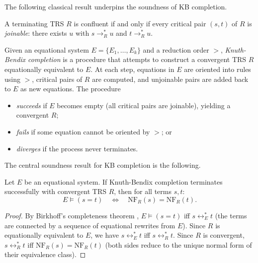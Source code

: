 The following classical result underpins the soundness of KB completion.

\begin{theorem}\label{thm:cpl}
A terminating TRS $R$ is confluent if and only if every critical pair $(s, t)$ of
$R$ is \emph{joinable}: there exists $u$ with $s \to_R^* u$ and $t \to_R^* u$.
\end{theorem}

\begin{definition}
\label{def:kb}
Given an equational system $E = \{E_1, \ldots, E_k\}$ and a reduction order $>$,
\emph{Knuth-Bendix completion} is a procedure that attempts to construct a convergent
TRS $R$ equationally equivalent to $E$.  At each step, equations in $E$ are oriented
into rules using $>$, critical pairs of $R$ are computed, and unjoinable pairs are
added back to $E$ as new equations.  The procedure
\begin{itemize}[leftmargin=*,itemsep=1pt,topsep=2pt]
  \item \emph{succeeds} if $E$ becomes empty (all critical pairs are joinable),
        yielding a convergent $R$;
  \item \emph{fails} if some equation cannot be oriented by $>$; or
  \item \emph{diverges} if the process never terminates.
\end{itemize}
\end{definition}

The central soundness result for KB completion is the following.

\begin{theorem}\label{thm:kb-classical}
Let $E$ be an equational system.  If Knuth-Bendix completion terminates successfully
with convergent TRS $R$, then for all terms $s, t$:
\[
  E \models (s = t)
  \quad\Longleftrightarrow\quad
  \mathrm{NF}_R(s) = \mathrm{NF}_R(t).
\]
\end{theorem}

\begin{proof}
By Birkhoff's completeness theorem \cite{birkhoff1935structure}, $E \models (s = t)$
iff $s \leftrightarrow_E^* t$ (the terms are connected by a sequence of equational
rewrites from $E$).  Since $R$ is equationally equivalent to $E$, we have
$s \leftrightarrow_E^* t$ iff $s \leftrightarrow_R^* t$.  Since $R$ is convergent,
$s \leftrightarrow_R^* t$ iff $\mathrm{NF}_R(s) = \mathrm{NF}_R(t)$ (both sides
reduce to the unique normal form of their equivalence class).
\end{proof}

